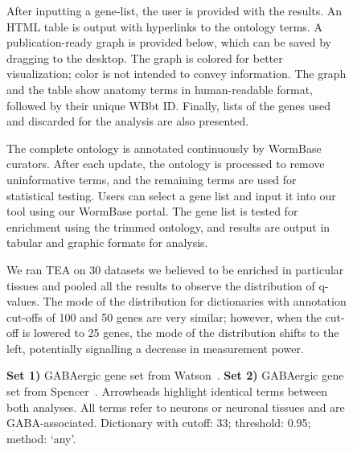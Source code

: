 \begin{figure}[htbp]
	\centering
  	\captionsetup{width= 0.95\textwidth}
 	\caption{
	After inputting a gene-list, the user is provided with the results. An HTML table is output with hyperlinks to the ontology terms. A publication-ready graph is provided below, which can be saved by  dragging to the desktop. The graph is colored for better visualization; color is not intended to convey information. The graph and the table show anatomy terms in  human-readable format, followed by their unique WBbt ID. Finally, lists  of the genes used and discarded for the analysis are also presented.
  }
  \label{fig:GUIresults}
\end{figure}


\begin{figure}[htbp]
	\centering
	\captionsetup{width= 0.95\textwidth}
	\caption{
	The complete ontology is annotated continuously by WormBase curators. After each update, the ontology is processed to remove uninformative terms, and the remaining terms are used for statistical testing.
	Users can select a gene list and input it into our tool using our WormBase portal. The gene list is tested for enrichment using the trimmed ontology, and results are output in tabular and graphic formats for analysis.
	}
	\label{fig:workflow}
\end{figure}


\begin{figure}[htbp]
  \captionsetup{width= 0.95\textwidth}
  \caption{
      We ran TEA on 30 datasets we believed to be enriched in particular tissues and pooled all the results to observe the distribution of q-values. The mode of the distribution for dictionaries with annotation cut-offs of 100 and 50 genes are very similar; however, when the cut-off is lowered to 25 genes, the mode of the distribution shifts to the left, potentially signalling a decrease in measurement power.
	  }
	  \label{fig:qvals}
\end{figure}



\begin{figure}
  \captionsetup{width= 0.95\textwidth}
  \caption{
  \textbf{Set 1)} GABAergic gene set from Watson~\cite{Watson2008a}.
  \textbf{Set 2)} GABAergic gene set from Spencer~\cite{Spencer2011}.
  Arrowheads highlight identical terms between both analyses. All terms refer to neurons or neuronal tissues and are GABA-associated. Dictionary with cutoff: 33; threshold: 0.95; method: `any'.
   }
  \label{fig:interagree}
\end{figure}


